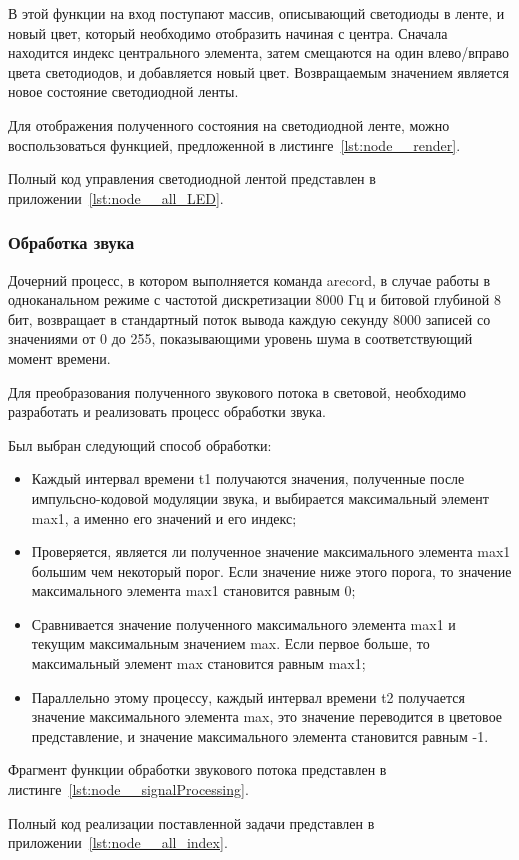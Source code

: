 В этой функции на вход поступают массив, описывающий светодиоды в ленте, и новый цвет, который необходимо отобразить начиная с центра. Сначала находится индекс центрального элемента, затем смещаются на один влево/вправо цвета светодиодов, и добавляется новый цвет. Возвращаемым значением является новое состояние светодиодной ленты.

Для отображения полученного состояния на светодиодной ленте, можно воспользоваться функцией, предложенной в листинге~\ref{lst:node__render}.



Полный код управления светодиодной лентой представлен в приложении~\ref{lst:node__all_LED}.

\subsubsection{Обработка звука}

Дочерний процесс, в котором выполняется команда arecord, в случае работы в одноканальном режиме с частотой дискретизации 8000 Гц и битовой глубиной 8 бит, возвращает в стандартный поток вывода каждую секунду 8000 записей со значениями от 0 до 255, показывающими уровень шума в соответствующий момент времени.

Для преобразования полученного звукового потока в световой, необходимо разработать и реализовать процесс обработки звука.

Был выбран следующий способ обработки:

\begin{itemize}
  \item Каждый интервал времени t1 получаются значения, полученные после импульсно-кодовой модуляции звука, и выбирается максимальный элемент max1, а именно его значений и его индекс;
  \item Проверяется, является ли полученное значение максимального элемента max1 большим чем некоторый порог. Если значение ниже этого порога, то значение максимального элемента max1 становится равным 0;
  \item Сравнивается значение полученного максимального элемента max1 и текущим максимальным значением max. Если первое больше, то максимальный элемент max становится равным max1;
  \item Параллельно этому процессу, каждый интервал времени t2 получается значение максимального элемента max, это значение переводится в цветовое представление, и значение максимального элемента становится равным -1.
\end{itemize}

Фрагмент функции обработки звукового потока представлен в листинге~\ref{lst:node__signalProcessing}.



Полный код реализации поставленной задачи представлен в приложении~\ref{lst:node__all_index}.
